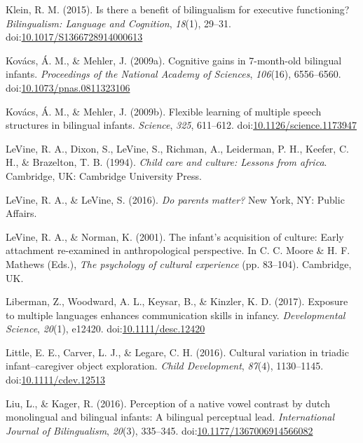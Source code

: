 \documentclass[,man,floatsintext]{apa6}
\begin{document}
\leavevmode\hypertarget{ref-Klein_2015}{}%
Klein, R. M. (2015). Is there a benefit of bilingualism for executive functioning? \emph{Bilingualism: Language and Cognition}, \emph{18}(1), 29--31. doi:\href{https://doi.org/10.1017/S1366728914000613}{10.1017/S1366728914000613}

\leavevmode\hypertarget{ref-Kovacs_Mehler_2009b}{}%
Kovács, Á. M., \& Mehler, J. (2009a). Cognitive gains in 7-month-old bilingual infants. \emph{Proceedings of the National Academy of Sciences}, \emph{106}(16), 6556--6560. doi:\href{https://doi.org/10.1073/pnas.0811323106}{10.1073/pnas.0811323106}

\leavevmode\hypertarget{ref-Kovacs_Mehler_2009a}{}%
Kovács, Á. M., \& Mehler, J. (2009b). Flexible learning of multiple speech structures in bilingual infants. \emph{Science}, \emph{325}, 611--612. doi:\href{https://doi.org/10.1126/science.1173947}{10.1126/science.1173947}

\leavevmode\hypertarget{ref-LeVine_etal_1994}{}%
LeVine, R. A., Dixon, S., LeVine, S., Richman, A., Leiderman, P. H., Keefer, C. H., \& Brazelton, T. B. (1994). \emph{Child care and culture: Lessons from africa}. Cambridge, UK: Cambridge University Press.

\leavevmode\hypertarget{ref-LeVine_LeVine_2016}{}%
LeVine, R. A., \& LeVine, S. (2016). \emph{Do parents matter?} New York, NY: Public Affairs.

\leavevmode\hypertarget{ref-LeVine_Norman_2001}{}%
LeVine, R. A., \& Norman, K. (2001). The infant's acquisition of culture: Early attachment re-examined in anthropological perspective. In C. C. Moore \& H. F. Mathews (Eds.), \emph{The psychology of cultural experience} (pp. 83--104). Cambridge, UK.

\leavevmode\hypertarget{ref-Liberman_etal_2017}{}%
Liberman, Z., Woodward, A. L., Keysar, B., \& Kinzler, K. D. (2017). Exposure to multiple languages enhances communication skills in infancy. \emph{Developmental Science}, \emph{20}(1), e12420. doi:\href{https://doi.org/10.1111/desc.12420}{10.1111/desc.12420}

\leavevmode\hypertarget{ref-Little_etal_2016}{}%
Little, E. E., Carver, L. J., \& Legare, C. H. (2016). Cultural variation in triadic infant--caregiver object exploration. \emph{Child Development}, \emph{87}(4), 1130--1145. doi:\href{https://doi.org/10.1111/cdev.12513}{10.1111/cdev.12513}

\leavevmode\hypertarget{ref-Liu_Kager_2016}{}%
Liu, L., \& Kager, R. (2016). Perception of a native vowel contrast by dutch monolingual and bilingual infants: A bilingual perceptual lead. \emph{International Journal of Bilingualism}, \emph{20}(3), 335--345. doi:\href{https://doi.org/10.1177/1367006914566082}{10.1177/1367006914566082}
\end{document}
